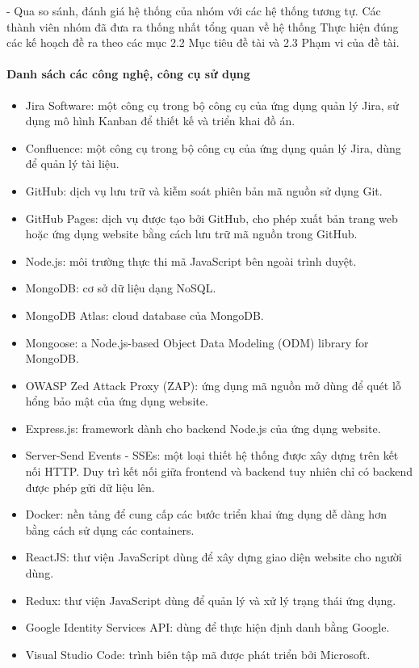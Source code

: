 - Qua so sánh, đánh giá hệ thống của nhóm với các hệ thống tương tự. 
Các thành viên nhóm đã đưa ra thống nhất tổng quan về hệ thống \applicationname Thực hiện đúng các kế
hoạch đề ra theo các mục 2.2 Mục tiêu đề tài và 2.3 Phạm vi của đề tài.

\paragraph{Danh sách các công nghệ, công cụ sử dụng}
\begin{itemize}
    \item Jira Software: một công cụ trong bộ công cụ của ứng dụng quản lý Jira, sử dụng mô hình Kanban để thiết kế và triển khai đồ án.
    \item Confluence: một công cụ trong bộ công cụ của ứng dụng quản lý Jira, dùng để quản lý tài liệu.
    \item GitHub: dịch vụ lưu trữ và kiễm soát phiên bản mã nguồn sử dụng Git.
    \item GitHub Pages: dịch vụ được tạo bởi GitHub, cho phép xuất bản trang web hoặc ứng dụng website bằng cách lưu trữ mã nguồn trong GitHub.
    \item Node.js: môi trường thực thi mã JavaScript bên ngoài trình duyệt.
    \item MongoDB: cơ sở dữ liệu dạng NoSQL.
    \item MongoDB Atlas: cloud database của MongoDB.
    \item Mongoose: a Node.js-based Object Data Modeling (ODM) library for MongoDB.
    \item OWASP Zed Attack Proxy (ZAP): ứng dụng mã nguồn mở dùng để quét lỗ hổng bảo mật của ứng dụng website.
    \item Express.js: framework dành cho backend Node.js của ứng dụng website.
    \item Server-Send Events - SSEs: một loại thiết hệ thống được xây dựng trên kết nối HTTP. Duy trì kết nối giữa frontend và backend tuy nhiên chỉ có backend được phép gửi dữ liệu lên.
    \item Docker: nền tảng để cung cấp các bước triển khai ứng dụng dễ dàng hơn bằng cách sử dụng các containers.
    \item ReactJS: thư viện JavaScript dùng để xây dựng giao diện website cho người dùng.
    \item Redux: thư viện JavaScript dùng để quản lý và xử lý trạng thái ứng dụng.
    \item Google Identity Services API: dùng để thực hiện định danh bằng Google.
    \item Visual Studio Code: trình biên tập mã được phát triển bởi Microsoft.
\end{itemize}
